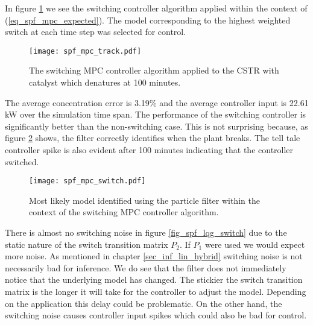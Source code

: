 In figure \ref{fig_spf_mpc_track} we see the switching controller algorithm applied within the context of (\ref{eq_spf_mpc_expected}). The model corresponding to the highest weighted switch at each time step was selected for control.
\begin{figure}[H] 
\centering
\texttt{[image: spf\_mpc\_track.pdf]}
\caption{The switching MPC controller algorithm applied to the CSTR with catalyst which denatures at 100 minutes.}
\label{fig_spf_mpc_track}
\end{figure}
The average concentration error is 3.19\% and the average controller input is 22.61 kW over the simulation time span. The performance of the switching controller is significantly better than the non-switching case. This is not surprising because, as figure \ref{fig_spf_mpc_switch} shows, the filter correctly identifies when the plant breaks. The tell tale controller spike is also evident after 100 minutes indicating that the controller switched.
\begin{figure}[H] 
\centering
\texttt{[image: spf\_mpc\_switch.pdf]}
\caption{Most likely model identified using the particle filter within the context of the switching MPC controller algorithm.}
\label{fig_spf_mpc_switch}
\end{figure}
There is almost no switching noise in figure \ref{fig_spf_lqg_switch} due to the static nature of the switch transition matrix $P_2$. If $P_1$ were used we would expect more noise. As mentioned in chapter \ref{sec_inf_lin_hybrid} switching noise is not necessarily bad for inference. We do see that the filter does not immediately notice that the underlying model has changed. The stickier the switch transition matrix is the longer it will take for the controller to adjust the model. Depending on the application this delay could be problematic. On the other hand, the switching noise causes controller input spikes which could also be bad for control. 

